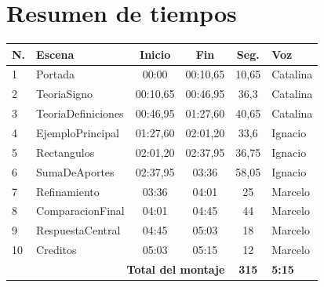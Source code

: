 \documentclass[11pt,a4paper]{article}
\begin{document}
\section*{Resumen de tiempos}
\begin{longtable}{|p{0.8cm}|p{4.0cm}|c|c|c|p{1.8cm}|}
\hline
\textbf{N.} & \textbf{Escena} & \textbf{Inicio} & \textbf{Fin} & \textbf{Seg.} & \textbf{Voz}\\\hline

1 & Portada & 00:00 & 00:10,65 & 10,65 & Catalina \\\hline

2 & TeoriaSigno & 00:10,65 & 00:46,95 & 36,3 & Catalina \\\hline

3 & TeoriaDefiniciones & 00:46,95 & 01:27,60 & 40,65 & Catalina \\\hline

4 & EjemploPrincipal & 01:27,60 & 02:01,20 & 33,6 & Ignacio \\\hline

5 & Rectangulos & 02:01,20 & 02:37,95 & 36,75 & Ignacio \\\hline

6 & SumaDeAportes & 02:37,95 & 03:36 & 58,05 & Ignacio \\\hline

7 & Refinamiento & 03:36 & 04:01 & 25 & Marcelo \\\hline

8 & ComparacionFinal & 04:01 & 04:45 & 44 & Marcelo \\\hline

9 & RespuestaCentral & 04:45 & 05:03 & 18 & Marcelo \\\hline

10 & Creditos & 05:03 & 05:15 & 12 & Marcelo \\\hline

\multicolumn{4}{|r|}{\textbf{Total del montaje}} & \textbf{315} & \textbf{5:15}\\\hline
\end{longtable}
\end{document}
